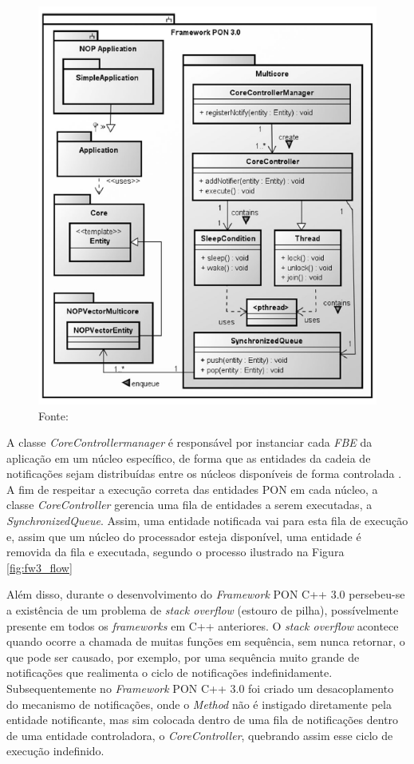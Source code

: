 \begin{figure}[!htb]
  \centering
  \includegraphics[width=.65\textwidth]{../figures/fw_30.png}
  \caption{Estrutura do \textit{framework} C++ 3.0} \caption*{Fonte:
    }
  \label{fig:fw3_struct}
\end{figure}

A classe \textit{CoreControllermanager} é responsável por instanciar cada
\textit{FBE} da aplicação em um núcleo específico, de forma que as entidades da
cadeia de notificações sejam distribuídas entre os núcleos disponíveis de forma
controlada \cite{doc_Schutz_2019}. A fim de respeitar a execução correta das
entidades PON em cada núcleo, a classe \textit{CoreController} gerencia uma fila
de entidades a serem executadas, a \textit{SynchronizedQueue}. Assim, uma
entidade notificada vai para esta fila de execução e, assim que um núcleo do
processador esteja disponível, uma entidade é removida da fila e executada,
segundo o processo ilustrado na Figura \ref{fig:fw3_flow}

Além disso, durante o desenvolvimento do \textit{Framework} PON C++ 3.0
persebeu-se a existência de um problema de \textit{stack overflow} (estouro de
pilha), possívelmente presente em todos os \textit{frameworks} em C++
anteriores. O \textit{stack overflow} acontece quando ocorre a chamada de muitas
funções em sequência, sem nunca retornar, o que pode ser causado, por exemplo,
por uma sequência muito grande de notificações que realimenta o ciclo de
notificações indefinidamente. Subsequentemente no \textit{Framework} PON C++ 3.0
foi criado um desacoplamento do mecanismo de notificações, onde o
\textit{Method} não é instigado diretamente pela entidade notificante, mas sim
colocada dentro de uma fila de notificações dentro de uma entidade controladora,
o \textit{CoreController}, quebrando assim esse ciclo de execução indefinido.

